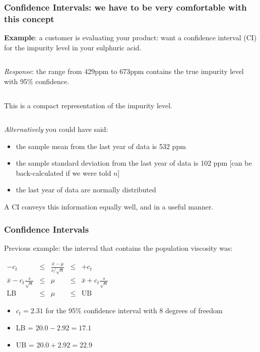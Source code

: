 \begin{frame}\frametitle{Confidence Intervals: we have to be \textbf{very} comfortable with this concept}

	\textbf{Example}: a customer is evaluating your product: want a confidence interval (CI) for the impurity level in your sulphuric acid.

	$\qquad$

	\emph{Response}: the range from 429ppm to 673ppm contains the true impurity level with 95\% confidence.

	$\qquad$

	This is a compact representation of the impurity level.

	$\qquad$

	\emph{Alternatively} you could have said:
	\begin{itemize}
		\item	the sample mean from the last year of data is 532 ppm
		\item	the sample standard deviation from the last year of data is 102 ppm [can be back-calculated if we were told $n$]
		\item	the last year of data are normally distributed
	\end{itemize}

	A CI conveys this information equally well, and in a useful manner.
\end{frame}

\begin{frame}\frametitle{Confidence Intervals}

	Previous example: the interval that contains the population viscosity was:

	$
	\begin{array}{rcccl}
		- c_t &\leq& \displaystyle \frac{\bar{x} - \mu}{s/\sqrt{n}} &\leq& +c_t\\
		\bar{x} - c_t \displaystyle \frac{s}{\sqrt{n}} &\leq& \mu &\leq& \bar{x} + c_t\displaystyle\frac{s}{\sqrt{n}} \\
		\text{LB} &\leq& \mu &\leq& \text{UB}
	\end{array}
	$
	\begin{itemize}
		\item	$c_t = 2.31$ for the 95\% confidence interval with 8 degrees of freedom
		\item	LB = $20.0 - 2.92 = 17.1$
		\item	UB = $20.0 + 2.92 = 22.9$
	\end{itemize}
\end{frame}


